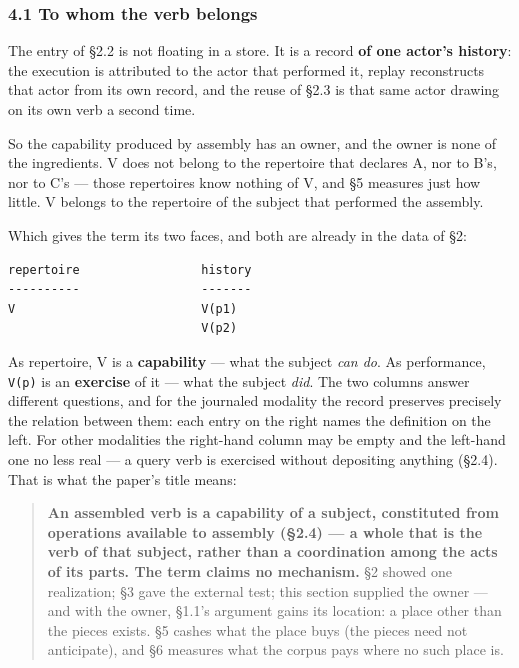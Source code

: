 \documentclass[
]{article}
\newcounter{none} %
\begin{document}
\subsubsection{4.1 To whom the verb
belongs}\label{to-whom-the-verb-belongs}

The entry of §2.2 is not floating in a store. It is a record \textbf{of
one actor's history}: the execution is attributed to the actor that
performed it, replay reconstructs that actor from its own record, and
the reuse of §2.3 is that same actor drawing on its own verb a second
time.

So the capability produced by assembly has an owner, and the owner is
none of the ingredients. V does not belong to the repertoire that
declares A, nor to B's, nor to C's --- those repertoires know nothing of
V, and §5 measures just how little. V belongs to the repertoire of the
subject that performed the assembly.

Which gives the term its two faces, and both are already in the data of
§2:

\begin{verbatim}
repertoire                 history
----------                 -------
V                          V(p1)
                           V(p2)
\end{verbatim}

As repertoire, V is a \textbf{capability} --- what the subject \emph{can
do}. As performance, \texttt{V(p)} is an \textbf{exercise} of it ---
what the subject \emph{did}. The two columns answer different questions,
and for the journaled modality the record preserves precisely the
relation between them: each entry on the right names the definition on
the left. For other modalities the right-hand column may be empty and
the left-hand one no less real --- a query verb is exercised without
depositing anything (§2.4). That is what the paper's title means:

\begin{quote}
\textbf{An assembled verb is a capability of a subject, constituted from
operations available to assembly (§2.4) --- a whole that is the verb of
that subject, rather than a coordination among the acts of its parts.
The term claims no mechanism.} §2 showed one realization; §3 gave the
external test; this section supplied the owner --- and with the owner,
§1.1's argument gains its location: a place other than the pieces
exists. §5 cashes what the place buys (the pieces need not anticipate),
and §6 measures what the corpus pays where no such place is.
\end{quote}
\end{document}
